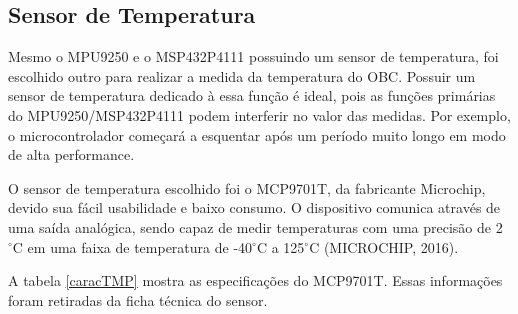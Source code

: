 \subsection{Sensor de Temperatura}

Mesmo o MPU9250 e o MSP432P4111 possuindo um sensor de temperatura, foi escolhido outro para realizar a medida da temperatura do OBC. Possuir um sensor de temperatura dedicado à essa função é ideal, pois as funções primárias do MPU9250/MSP432P4111 podem interferir no valor das medidas. Por exemplo, o microcontrolador começará a esquentar após um período muito longo em modo de alta performance. 

O sensor de temperatura escolhido foi o MCP9701T, da fabricante Microchip, devido sua fácil usabilidade e baixo consumo. O dispositivo comunica através de uma saída analógica, sendo capaz de medir temperaturas com uma precisão de 2 $^{\circ}$C em uma faixa de temperatura de -40$^{\circ}$C a 125$^{\circ}$C (MICROCHIP, 2016).

A tabela \ref{caracTMP} mostra as especificações do MCP9701T. Essas informações foram retiradas da ficha técnica do sensor.

